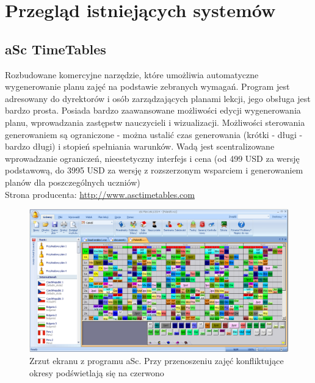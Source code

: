 \section{Przegląd istniejących systemów}



\subsection{aSc TimeTables}
Rozbudowane komercyjne narzędzie, które umożliwia automatyczne wygenerowanie planu zajęć na podstawie zebranych wymagań. Program jest adresowany do dyrektorów i osób zarządzających planami lekcji, jego obsługa jest bardzo prosta. Posiada bardzo zaawansowane możliwości edycji wygenerowania planu, wprowadzania zastępstw nauczycieli i wizualizacji. Możliwości sterowania generowaniem są ograniczone - można ustalić czas generowania (krótki - długi - bardzo długi) i stopień spełniania warunków. Wadą jest scentralizowane wprowadzanie ograniczeń, nieestetyczny interfejs i cena 
(od 499 USD za wersję podstawową, do 3995 USD za wersję z rozszerzonym wsparciem i generowaniem planów dla poszczególnych uczniów) \\
Strona producenta: \url{http://www.asctimetables.com}
\begin{figure}[H]
\includegraphics[width=15cm]{img/asc2.png}
\caption{Zrzut ekranu z programu aSc. Przy przenoszeniu zajęć konfliktujące okresy podświetlają się na czerwono}
\end{figure}

